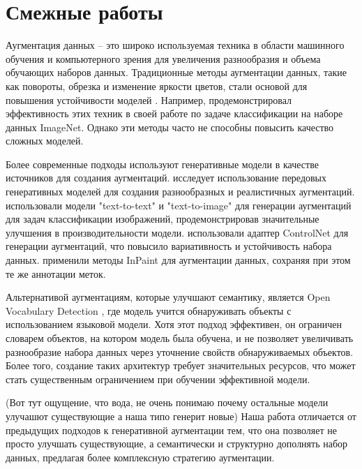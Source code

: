 \documentclass[11pt]{article}
\begin{document}

\section{Смежные работы}

Аугментация данных -- это широко используемая техника в области машинного обучения и компьютерного зрения для увеличения разнообразия и объема обучающих наборов данных. Традиционные методы аугментации данных, такие как повороты, обрезка и изменение яркости цветов, стали основой для повышения устойчивости моделей \cite{buslaev2020albumentations}. Например, \cite{krizhevsky2012imagenet} продемонстрировал эффективность этих техник в своей работе по задаче классификации на наборе данных ImageNet. Однако эти методы часто не способны повысить качество сложных моделей.

Более современные подходы используют генеративные модели в качестве источников для создания аугментаций. \cite{alimisis2024advances} исследует использование передовых генеративных моделей для создания разнообразных и реалистичных аугментаций. \cite{yin2023ttida} использовали модели "text-to-text" и "text-to-image" для генерации аугментаций для задач классификации изображений, продемонстрировав значительные улучшения в производительности модели. \cite{fang2024data} использовали адаптер ControlNet для генерации аугментаций, что повысило вариативность и устойчивость набора данных. \cite{kupyn2024dataset} применили методы InPaint для аугментации данных, сохраняя при этом те же аннотации меток.

Альтернативой аугментациям, которые улучшают семантику, является Open Vocabulary Detection \cite{wu2024towards}, где модель учится обнаруживать объекты с использованием языковой модели. Хотя этот подход эффективен, он ограничен словарем объектов, на котором модель была обучена, и не позволяет увеличивать разнообразие набора данных через уточнение свойств обнаруживаемых объектов. Более того, создание таких архитектур требует значительных ресурсов, что может стать существенным ограничением при обучении эффективной модели.


(Вот тут ощущение, что вода, не очень понимаю почему остальные модели улучашют существующие а наша типо генерит новые)
Наша работа отличается от предыдущих подходов к генеративной аугментации тем, что она позволяет не просто улучшать существующие, а семантически и структурно дополнять набор данных, предлагая более комплексную стратегию аугментации.
\end{document}
